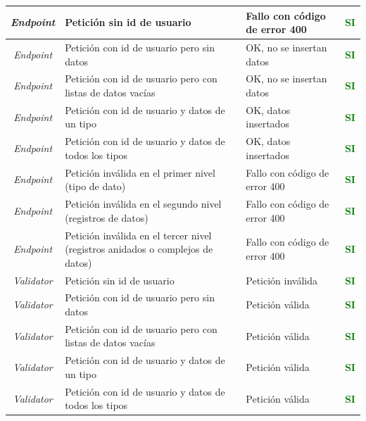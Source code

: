 \begin{xltabular}{\textwidth}{|c|X|X|c|}
            \textit{Endpoint} & Petición sin id de usuario & Fallo con código de error 400 & \textcolor{green}{\textbf{SI}} \\
            \hline
            \textit{Endpoint} & Petición con id de usuario pero sin datos & OK, no se insertan datos & \textcolor{green}{\textbf{SI}} \\
            \hline
            \textit{Endpoint} & Petición con id de usuario pero con listas de datos vacías & OK, no se insertan datos & \textcolor{green}{\textbf{SI}} \\
            \hline
            \textit{Endpoint} & Petición con id de usuario y datos de un tipo & OK, datos insertados & \textcolor{green}{\textbf{SI}} \\
            \hline
            \textit{Endpoint} & Petición con id de usuario y datos de todos los tipos & OK, datos insertados & \textcolor{green}{\textbf{SI}} \\
            \hline
            \textit{Endpoint} & Petición inválida en el primer nivel (tipo de dato) & Fallo con código de error 400 & \textcolor{green}{\textbf{SI}} \\
            \hline
            \textit{Endpoint} & Petición inválida en el segundo nivel (registros de datos) & Fallo con código de error 400 & \textcolor{green}{\textbf{SI}} \\
            \hline
            \textit{Endpoint} & Petición inválida en el tercer nivel (registros anidados o complejos de datos) & Fallo con código de error 400 & \textcolor{green}{\textbf{SI}} \\
            \hline
            \textit{Validator} & Petición sin id de usuario & Petición inválida & \textcolor{green}{\textbf{SI}} \\
            \hline
            \textit{Validator} & Petición con id de usuario pero sin datos & Petición válida & \textcolor{green}{\textbf{SI}} \\
            \hline
            \textit{Validator} & Petición con id de usuario pero con listas de datos vacías & Petición válida & \textcolor{green}{\textbf{SI}} \\
            \hline
            \textit{Validator} & Petición con id de usuario y datos de un tipo & Petición válida & \textcolor{green}{\textbf{SI}} \\
            \hline
            \textit{Validator} & Petición con id de usuario y datos de todos los tipos & Petición válida & \textcolor{green}{\textbf{SI}} \\

\end{xltabular}
